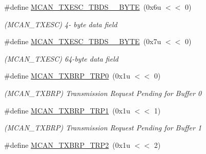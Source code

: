 \begin{DoxyCompactItemize}
\mbox{\label{group__SAMV71__MCAN_gaca474e7d82d46ae8315ea0af1a847c36}} 
\#define \mbox{\hyperlink{group__SAMV71__MCAN_gaca474e7d82d46ae8315ea0af1a847c36}{M\+C\+A\+N\+\_\+\+T\+X\+E\+S\+C\+\_\+\+T\+B\+D\+S\+\_\+\_\+\+B\+Y\+TE}}~(0x6u $<$$<$ 0)
\begin{DoxyCompactList}\small\item\em (M\+C\+A\+N\+\_\+\+T\+X\+E\+SC) 4-\/ byte data field \end{DoxyCompactList}\item 
\mbox{\label{group__SAMV71__MCAN_ga57650a3f6f9f289da5585b5a84c5823d}} 
\#define \mbox{\hyperlink{group__SAMV71__MCAN_ga57650a3f6f9f289da5585b5a84c5823d}{M\+C\+A\+N\+\_\+\+T\+X\+E\+S\+C\+\_\+\+T\+B\+D\+S\+\_\+\_\+\+B\+Y\+TE}}~(0x7u $<$$<$ 0)
\begin{DoxyCompactList}\small\item\em (M\+C\+A\+N\+\_\+\+T\+X\+E\+SC) 64-\/byte data field \end{DoxyCompactList}\item 
\mbox{\label{group__SAMV71__MCAN_gadc642b8a347be0717fa10e28bb033d21}} 
\#define \mbox{\hyperlink{group__SAMV71__MCAN_gadc642b8a347be0717fa10e28bb033d21}{M\+C\+A\+N\+\_\+\+T\+X\+B\+R\+P\+\_\+\+T\+R\+P0}}~(0x1u $<$$<$ 0)
\begin{DoxyCompactList}\small\item\em (M\+C\+A\+N\+\_\+\+T\+X\+B\+RP) Transmission Request Pending for Buffer 0 \end{DoxyCompactList}\item 
\mbox{\label{group__SAMV71__MCAN_ga6514c57bd759173589727eb0e987350d}} 
\#define \mbox{\hyperlink{group__SAMV71__MCAN_ga6514c57bd759173589727eb0e987350d}{M\+C\+A\+N\+\_\+\+T\+X\+B\+R\+P\+\_\+\+T\+R\+P1}}~(0x1u $<$$<$ 1)
\begin{DoxyCompactList}\small\item\em (M\+C\+A\+N\+\_\+\+T\+X\+B\+RP) Transmission Request Pending for Buffer 1 \end{DoxyCompactList}\item 
\mbox{\label{group__SAMV71__MCAN_gafc9654b93bc2541d31ded01aeb42d44d}} 
\#define \mbox{\hyperlink{group__SAMV71__MCAN_gafc9654b93bc2541d31ded01aeb42d44d}{M\+C\+A\+N\+\_\+\+T\+X\+B\+R\+P\+\_\+\+T\+R\+P2}}~(0x1u $<$$<$ 2)
$$
\end{DoxyCompactItemize}
